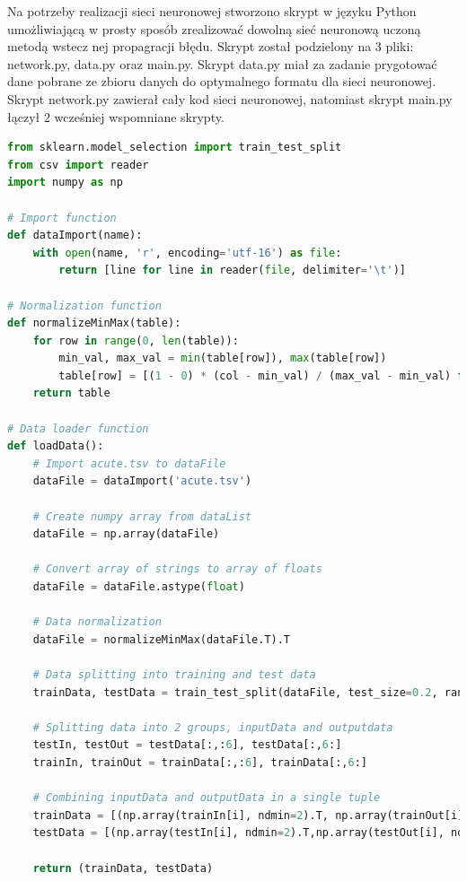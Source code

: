 \documentclass[12pt,twoside]{article}
\begin{document}
Na potrzeby realizacji sieci neuronowej stworzono skrypt w języku Python umożliwiającą w prosty sposób zrealizować dowolną sieć neuronową uczoną metodą wstecz nej propagracji błędu.
Skrypt został podzielony na 3 pliki: network.py, data.py oraz main.py.
Skrypt data.py miał za zadanie prygotować dane pobrane ze zbioru danych do optymalnego formatu dla sieci neuronowej. Skrypt network.py zawierał cały kod sieci neuronowej, natomiast skrypt main.py łączył 2 wcześniej wspomniane skrypty.

\begin{lstlisting}[caption={Plik przygotowujący dane- data.py},label={Lst:data_py},language=Python,basicstyle=\scriptsize]
from sklearn.model_selection import train_test_split
from csv import reader
import numpy as np

# Import function
def dataImport(name):
    with open(name, 'r', encoding='utf-16') as file:
        return [line for line in reader(file, delimiter='\t')]

# Normalization function
def normalizeMinMax(table):
    for row in range(0, len(table)):
        min_val, max_val = min(table[row]), max(table[row])
        table[row] = [(1 - 0) * (col - min_val) / (max_val - min_val) for col in table[row]]
    return table

# Data loader function
def loadData():
    # Import acute.tsv to dataFile
    dataFile = dataImport('acute.tsv')

    # Create numpy array from dataList
    dataFile = np.array(dataFile)

    # Convert array of strings to array of floats
    dataFile = dataFile.astype(float)

    # Data normalization
    dataFile = normalizeMinMax(dataFile.T).T

    # Data splitting into training and test data
    trainData, testData = train_test_split(dataFile, test_size=0.2, random_state=25)

    # Splitting data into 2 groups, inputData and outputdata
    testIn, testOut = testData[:,:6], testData[:,6:]
    trainIn, trainOut = trainData[:,:6], trainData[:,6:]

    # Combining inputData and outputData in a single tuple
    trainData = [(np.array(trainIn[i], ndmin=2).T, np.array(trainOut[i], ndmin=2).T) for i in range(0, len(trainOut))]
    testData = [(np.array(testIn[i], ndmin=2).T,np.array(testOut[i], ndmin=2).T) for i in range(0, len(testOut))]

    return (trainData, testData)
\end{lstlisting}
\end{document}
